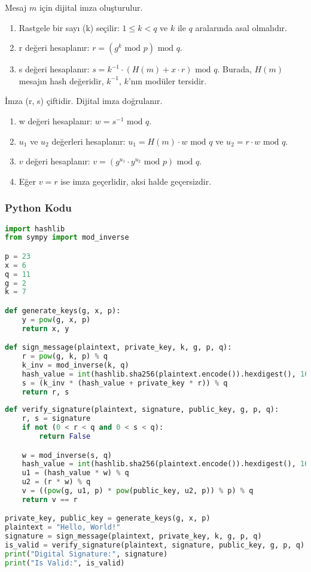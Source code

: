 Mesaj $m$ için dijital imza oluşturulur.

\begin{enumerate}
    \item Rastgele bir sayı (k) seçilir: $1 \leq k < q$ ve $k$ ile $q$ aralarında asal olmalıdır.
    \item r değeri hesaplanır: $r = (g^k \text{ mod } p) \text{ mod } q$.
    \item s değeri hesaplanır: $s = k^{-1} \cdot (H(m) + x \cdot r) \text{ mod } q$. Burada, $H(m)$ mesajın hash değeridir, $k^{-1}$, $k$'nın modüler tersidir.
\end{enumerate}

İmza (r, s) çiftidir. Dijital imza doğrulanır.

\begin{enumerate}
    \item w değeri hesaplanır: $w = s^{-1} \text{ mod } q$.
    \item $u_1$ ve $u_2$ değerleri hesaplanır: $u_1 = H(m) \cdot w \text{ mod } q$ ve $u_2 = r \cdot w \text{ mod } q$.
    \item $v$ değeri hesaplanır: $v = (g^{u_1} \cdot y^{u_2} \text{ mod } p) \text{ mod } q$.
    \item Eğer $v = r$ ise imza geçerlidir, aksi halde geçersizdir.
\end{enumerate}

\subsubsection{Python Kodu}

\begin{lstlisting}[language=Python]
import hashlib
from sympy import mod_inverse

p = 23
x = 6
q = 11
g = 2
k = 7

def generate_keys(g, x, p):
    y = pow(g, x, p)
    return x, y

def sign_message(plaintext, private_key, k, g, p, q):
    r = pow(g, k, p) % q
    k_inv = mod_inverse(k, q)
    hash_value = int(hashlib.sha256(plaintext.encode()).hexdigest(), 16) % q
    s = (k_inv * (hash_value + private_key * r)) % q
    return r, s
    
def verify_signature(plaintext, signature, public_key, g, p, q):
    r, s = signature
    if not (0 < r < q and 0 < s < q):
        return False

    w = mod_inverse(s, q)
    hash_value = int(hashlib.sha256(plaintext.encode()).hexdigest(), 16) % q
    u1 = (hash_value * w) % q
    u2 = (r * w) % q
    v = ((pow(g, u1, p) * pow(public_key, u2, p)) % p) % q
    return v == r

private_key, public_key = generate_keys(g, x, p)
plaintext = "Hello, World!"
signature = sign_message(plaintext, private_key, k, g, p, q)
is_valid = verify_signature(plaintext, signature, public_key, g, p, q)
print("Digital Signature:", signature)
print("Is Valid:", is_valid)
\end{lstlisting}

